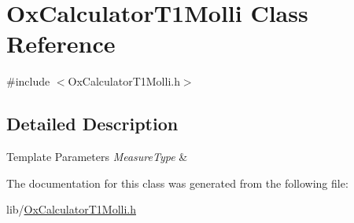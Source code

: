 \hypertarget{class_ox_calculator_t1_molli}{\section{Ox\-Calculator\-T1\-Molli Class Reference}
\label{class_ox_calculator_t1_molli}
}


{\ttfamily \#include $<$Ox\-Calculator\-T1\-Molli.\-h$>$}



\subsection{Detailed Description}

\begin{DoxyTemplParams}{Template Parameters}
{\em Measure\-Type} & \\
\hline
\end{DoxyTemplParams}


The documentation for this class was generated from the following file\-:\begin{DoxyCompactItemize}
\item 
lib/\hyperlink{_ox_calculator_t1_molli_8h}{Ox\-Calculator\-T1\-Molli.\-h}\end{DoxyCompactItemize}
